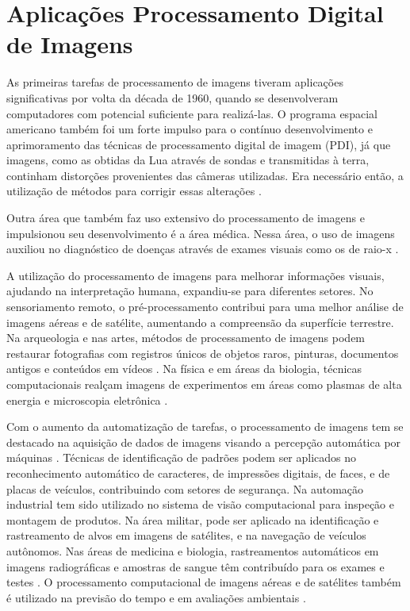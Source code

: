 \documentclass[
  brazilian,
]{book}
\begin{document}
\hypertarget{aplicauxe7uxf5es-processamento-digital-de-imagens}{%
\section{Aplicações Processamento Digital de Imagens}\label{aplicauxe7uxf5es-processamento-digital-de-imagens}}

As primeiras tarefas de processamento de imagens tiveram aplicações significativas por volta da década de 1960, quando se desenvolveram computadores com potencial suficiente para realizá-las. O programa espacial americano também foi um forte impulso para o contínuo desenvolvimento e aprimoramento das técnicas de processamento digital de imagem (PDI), já que imagens, como as obtidas da Lua através de sondas e transmitidas à terra, continham distorções provenientes das câmeras utilizadas. Era necessário então, a utilização de métodos para corrigir essas alterações \autocite[p.~4]{gonzalez2010}.

Outra área que também faz uso extensivo do processamento de imagens e impulsionou seu desenvolvimento é a área médica. Nessa área, o uso de imagens auxiliou no diagnóstico de doenças através de exames visuais como os de raio-x \autocite[p.~4]{gonzalez2010}.

A utilização do processamento de imagens para melhorar informações visuais, ajudando na interpretação humana, expandiu-se para diferentes setores. No sensoriamento remoto, o pré-processamento contribui para uma melhor análise de imagens aéreas e de satélite, aumentando a compreensão da superfície terrestre. Na arqueologia e nas artes, métodos de processamento de imagens podem restaurar fotografias com registros únicos de objetos raros, pinturas, documentos antigos e conteúdos em vídeos \autocite[p.~2]{pedrini2008}. Na física e em áreas da biologia, técnicas computacionais realçam imagens de experimentos em áreas como plasmas de alta energia e microscopia eletrônica \autocite[p.~5]{gonzalez2010}.

Com o aumento da automatização de tarefas, o processamento de imagens tem se destacado na aquisição de dados de imagens visando a percepção automática por máquinas \autocite[p.~3]{pedrini2008}. Técnicas de identificação de padrões podem ser aplicados no reconhecimento automático de caracteres, de impressões digitais, de faces, e de placas de veículos, contribuindo com setores de segurança. Na automação industrial tem sido utilizado no sistema de visão computacional para inspeção e montagem de produtos. Na área militar, pode ser aplicado na identificação e rastreamento de alvos em imagens de satélites, e na navegação de veículos autônomos. Nas áreas de medicina e biologia, rastreamentos automáticos em imagens radiográficas e amostras de sangue têm contribuído para os exames e testes \autocite[p.~3]{pedrini2008}. O processamento computacional de imagens aéreas e de satélites também é utilizado na previsão do tempo e em avaliações ambientais \autocite[p.~5]{gonzalez2010}.
\end{document}
